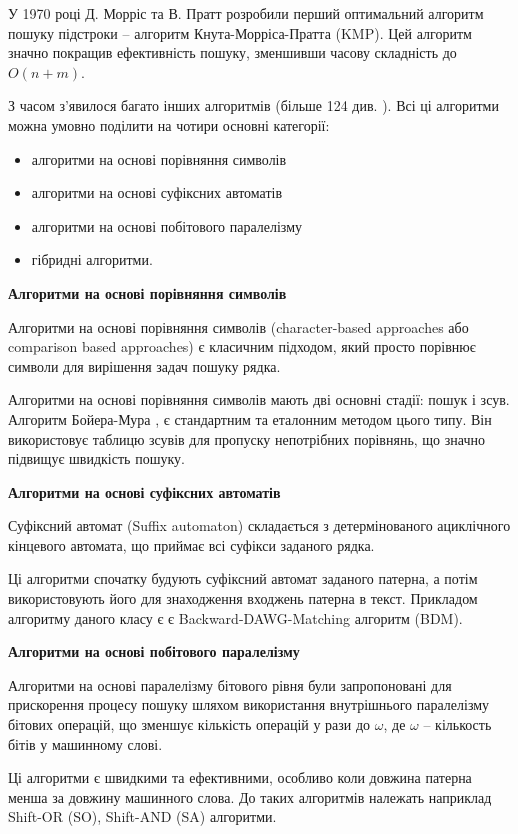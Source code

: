 \documentclass[a4paper,14pt]{extarticle} %
\begin{document}
	У 1970 році Д. Морріс та В. Пратт \cite{morris-pratt} розробили перший оптимальний алгоритм пошуку підстроки – алгоритм Кнута-Морріса-Пратта (KMP). Цей алгоритм значно покращив ефективність пошуку, зменшивши часову складність до \( O(n + m) \).

	З часом з'явилося багато інших алгоритмів (більше 124 див. \cite{smart}). Всі ці алгоритми можна умовно поділити на чотири основні категорії:
	\begin{itemize}
		\item алгоритми на основі порівняння символів
		\item  алгоритми на основі суфіксних автоматів
		\item алгоритми на основі побітового паралелізму
		\item гібридні алгоритми.
	\end{itemize}

\textbf{Алгоритми на основі порівняння символів}

Алгоритми на основі порівняння символів (character-based approaches або comparison based approaches) є класичним підходом, який просто порівнює символи для вирішення задач пошуку рядка.

Алгоритми на основі порівняння символів мають дві основні стадії: пошук і зсув. Алгоритм Бойера-Мура \cite{bm}, є стандартним та еталонним методом цього типу. Він використовує таблицю зсувів для пропуску непотрібних порівнянь, що значно підвищує швидкість пошуку.

\textbf{Алгоритми на основі суфіксних автоматів}

Суфіксний автомат (Suffix automaton) складається з детермінованого ациклічного кінцевого автомата, що приймає всі суфікси заданого рядка.

Ці алгоритми спочатку будують суфіксний автомат заданого патерна, а потім використовують його для знаходження входжень патерна в текст.
Прикладом алгоритму даного класу є є Backward-DAWG-Matching алгоритм (BDM).

\textbf{Алгоритми на основі побітового паралелізму}

Алгоритми на основі паралелізму бітового рівня були запропоновані для прискорення процесу пошуку шляхом використання внутрішнього паралелізму бітових операцій, що зменшує кількість операцій у рази до $\omega$, де $\omega$ –  кількость бітів у машинному слові.

Ці алгоритми є швидкими та ефективними, особливо коли довжина патерна менша за довжину машинного слова. До таких алгоритмів належать наприклад Shift-OR (SO), Shift-AND (SA) алгоритми.
\end{document}
